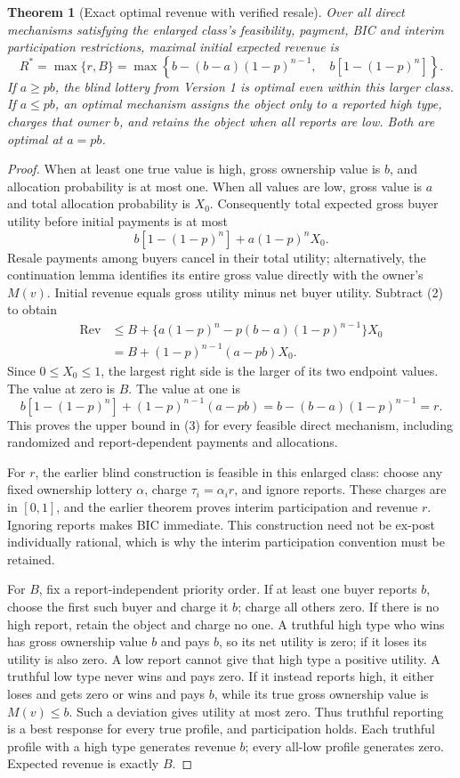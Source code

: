 \documentclass[11pt]{article}
\newtheorem{theorem}{Theorem}
\theoremstyle{definition}
\theoremstyle{remark}
\begin{document}
\begin{theorem}[Exact optimal revenue with verified resale]
Over all direct mechanisms satisfying the enlarged class's feasibility,
payment, BIC and interim participation restrictions, maximal initial
expected revenue is
\[
 R^*=\max\{r,B\}
 =\max\left\{b-(b-a)(1-p)^{n-1},\quad
                   b[1-(1-p)^n]\right\}.                    \tag{3}
\]
If $a\geq pb$, the blind lottery from Version 1 is optimal even within
this larger class. If $a\leq pb$, an optimal mechanism assigns the
object only to a reported high type, charges that owner $b$, and
retains the object when all reports are low. Both are optimal at
$a=pb$.
\end{theorem}
\begin{proof}
When at least one true value is high, gross ownership value is $b$,
and allocation probability is at most one. When all values are low,
gross value is $a$ and total allocation probability is $X_0$.
Consequently total expected gross buyer utility before initial payments
is at most
\[
 b[1-(1-p)^n]+a(1-p)^n X_0.
\]
Resale payments among buyers cancel in their total utility; alternatively,
the continuation lemma identifies its entire gross value directly with
the owner's $M(v)$. Initial revenue equals gross utility minus net
buyer utility. Subtract (2) to obtain
\begin{align*}
 \operatorname{Rev}
 &\leq B+\{a(1-p)^n-p(b-a)(1-p)^{n-1}\}X_0\\
 &=B+(1-p)^{n-1}(a-pb)X_0.                               \tag{4}
\end{align*}
Since $0\leq X_0\leq1$, the largest right side is the larger of its
two endpoint values. The value at zero is $B$. The value at one is
\[
 b[1-(1-p)^n]+(1-p)^{n-1}(a-pb)
 =b-(b-a)(1-p)^{n-1}=r.
\]
This proves the upper bound in (3) for every feasible direct mechanism,
including randomized and report-dependent payments and allocations.

For $r$, the earlier blind construction is feasible in this enlarged
class: choose any fixed ownership lottery $\alpha$, charge
$\tau_i=\alpha_i r$, and ignore reports. These charges are in $[0,1]$,
and the earlier theorem proves interim participation and revenue $r$.
Ignoring reports makes BIC immediate. This construction need not be
ex-post individually rational, which is why the interim participation
convention must be retained.

For $B$, fix a report-independent priority order. If at least one buyer
reports $b$, choose the first such buyer and charge it $b$; charge all
others zero. If there is no high report, retain the object and charge
no one. A truthful high type who wins has gross ownership value $b$
and pays $b$, so its net utility is zero; if it loses its utility is
also zero. A low report cannot give that high type a positive utility.
A truthful low type never wins and pays zero. If it instead reports
high, it either loses and gets zero or wins and pays $b$, while its
true gross ownership value is $M(v)\leq b$. Such a deviation gives
utility at most zero. Thus truthful reporting is a best response for
every true profile, and participation holds. Each truthful profile with
a high type generates revenue $b$; every all-low profile generates
zero. Expected revenue is exactly $B$.


\end{proof}
\end{document}
